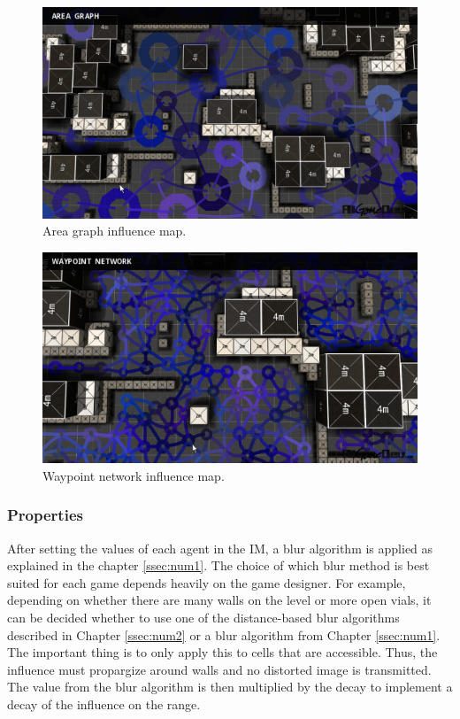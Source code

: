 \documentclass[]{report}
\begin{document}
	\begin{figure}[h!]
		\centering
		\includegraphics[width=0.8\linewidth]{Images/screenshot001_aregraph1}
		\caption[Area graph influence map.]{Area graph influence map. \citep{gameDevInfluenceMap} \citep{imPathfinding}}
		\label{fig:screenshot001aregraph1}
	\end{figure}
	
	\begin{figure}[h!]
		\centering
		\includegraphics[width=0.8\linewidth]{Images/screenshot001_aregraph2}
		\caption[Waypoint network influence map.]{Waypoint network influence map. \citep{gameDevInfluenceMap} \citep{imPathfinding}}
		\label{fig:screenshot001aregraph2}
	\end{figure}
	
	\newpage
	\subsubsection{Properties}
	After setting the values of each agent in the IM, a blur algorithm is applied as explained in the chapter \ref{ssec:num1}. The choice of which blur method is best suited for each game depends heavily on the game designer. For example, depending on whether there are many walls on the level or more open vials, it can be decided whether to use one of the distance-based blur algorithms described in Chapter \ref{ssec:num2} or a blur algorithm from Chapter \ref{ssec:num1}. The important thing is to only apply this to cells that are accessible. Thus, the influence must propargize around walls and no distorted image is transmitted. The value from the blur algorithm is then multiplied by the decay to implement a decay of the influence on the range. 
	
\end{document}
